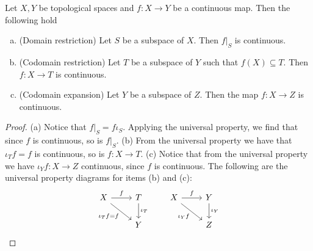 \begin{corollary}\label{cor: subspace maps properties}
Let \(X, Y\) be topological spaces and \(f: X \to Y\) be a continuous map.
Then the following hold
\begin{enumerate}[(a)]
  \item (Domain restriction) Let \(S\) be a subspace of \(X\). Then \(f|_S\)
    is continuous.
  \item (Codomain restriction) Let \(T\) be a subspace of \(Y\) such that
    \(f(X) \subseteq T\). Then \(f: X \to T\) is continuous.
  \item (Codomain expansion) Let \(Y\) be a subspace of \(Z\). Then the map
    \(f : X \to Z\) is continuous.
\end{enumerate}
\end{corollary}

\begin{proof}
(a) Notice that \(f|_S = f  \iota_S\). Applying the universal property,
we find that since \(f\) is continuous, so is \(f|_S\). (b) From the universal
property we have that \(\iota_T  f = f\) is continuous, so is \(f: X \to
T\). (c) Notice that from the universal property we have \(\iota_Y  f: X
\to Z\) continuous, since \(f\) is continuous. The following are the universal
property diagrams for items (b) and (c):
\[
  \begin{tikzcd}
    X \rar["f"] \ar[rd, swap, "\iota_T  f = f"] &T \dar["\iota_T"] \\ &Y
  \end{tikzcd}
  \qquad
  \begin{tikzcd}
    X \rar["f"] \ar[rd, swap, "\iota_Y  f"] &Y \dar["\iota_Y"] \\ &Z
  \end{tikzcd}
\]
\end{proof}

